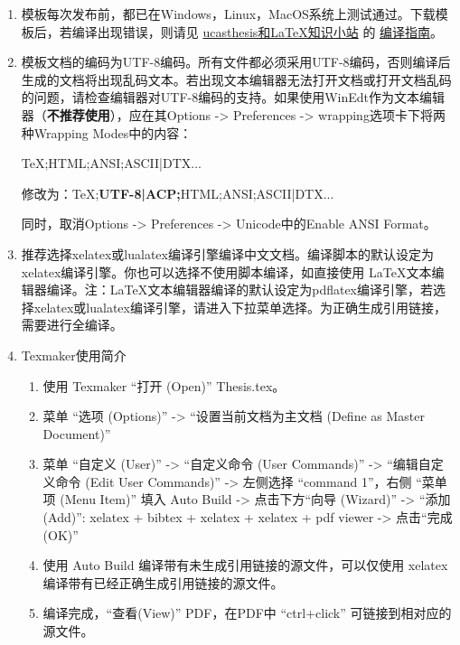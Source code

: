 \begin{enumerate}
    \item 模板每次发布前，都已在Windows，Linux，MacOS系统上测试通过。下载模板后，若编译出现错误，则请见 \href{https://github.com/mohuangrui/ucasthesis/wiki}{ucasthesis和\LaTeX{}知识小站} 的 \href{https://github.com/mohuangrui/ucasthesis/wiki/%E7%BC%96%E8%AF%91%E6%8C%87%E5%8D%97}{编译指南}。

    \item 模板文档的编码为UTF-8编码。所有文件都必须采用UTF-8编码，否则编译后生成的文档将出现乱码文本。若出现文本编辑器无法打开文档或打开文档乱码的问题，请检查编辑器对UTF-8编码的支持。如果使用WinEdt作为文本编辑器（\textbf{不推荐使用}），应在其Options -> Preferences -> wrapping选项卡下将两种Wrapping Modes中的内容：
        
        TeX;HTML;ANSI;ASCII|DTX...
        
        修改为：TeX;\textbf{UTF-8|ACP;}HTML;ANSI;ASCII|DTX...
        
        同时，取消Options -> Preferences -> Unicode中的Enable ANSI Format。

    \item 推荐选择xelatex或lualatex编译引擎编译中文文档。编译脚本的默认设定为xelatex编译引擎。你也可以选择不使用脚本编译，如直接使用 \LaTeX{}文本编辑器编译。注：\LaTeX{}文本编辑器编译的默认设定为pdflatex编译引擎，若选择xelatex或lualatex编译引擎，请进入下拉菜单选择。为正确生成引用链接，需要进行全编译。

    \item Texmaker使用简介
        \begin{enumerate}
            \footnotesize
            \item 使用 Texmaker “打开 (Open)” Thesis.tex。
            \item 菜单 “选项 (Options)” -> “设置当前文档为主文档 (Define as Master Document)”
            \item 菜单 “自定义 (User)” -> “自定义命令 (User Commands)” -> “编辑自定义命令 (Edit User Commands)” -> 左侧选择 “command 1”，右侧 “菜单项 (Menu Item)” 填入 Auto Build -> 点击下方“向导 (Wizard)” -> “添加 (Add)”: xelatex + bibtex + xelatex + xelatex + pdf viewer -> 点击“完成 (OK)”
            \item 使用 Auto Build 编译带有未生成引用链接的源文件，可以仅使用 xelatex 编译带有已经正确生成引用链接的源文件。
            \item 编译完成，“查看(View)” PDF，在PDF中 “ctrl+click” 可链接到相对应的源文件。
        \end{enumerate}
    

\end{enumerate}
